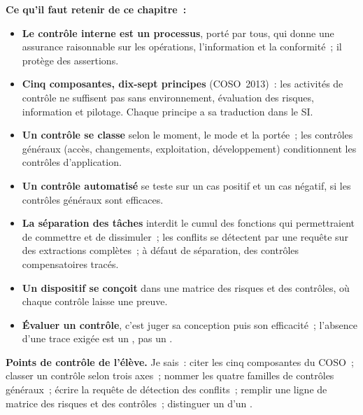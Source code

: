 \begin{boxresume}
\textbf{Ce qu'il faut retenir de ce chapitre~:}
\begin{itemize}
    \item \textbf{Le contrôle interne est un processus}, porté par tous,
          qui donne une assurance raisonnable sur les opérations,
          l'information et la conformité~; il protège des assertions.
    \item \textbf{Cinq composantes, dix-sept principes} (COSO~2013)~: les
          activités de contrôle ne suffisent pas sans environnement,
          évaluation des risques, information et pilotage. Chaque principe
          a sa traduction dans le SI.
    \item \textbf{Un contrôle se classe} selon le moment, le mode et la
          portée~; les contrôles généraux (accès, changements,
          exploitation, développement) conditionnent les contrôles
          d'application.
    \item \textbf{Un contrôle automatisé} se teste sur un cas positif et un
          cas négatif, si les contrôles généraux sont efficaces.
    \item \textbf{La séparation des tâches} interdit le cumul des fonctions
          qui permettraient de commettre et de dissimuler~; les conflits se
          détectent par une requête sur des extractions complètes~; à
          défaut de séparation, des contrôles compensatoires tracés.
    \item \textbf{Un dispositif se conçoit} dans une matrice des risques et
          des contrôles, où chaque contrôle laisse une preuve.
    \item \textbf{Évaluer un contrôle}, c'est juger sa conception puis son
          efficacité~; l'absence d'une trace exigée est un \NON{}, pas un
          \NEK{}.
\end{itemize}
\end{boxresume}

\begin{boxinfo}
\textbf{Points de contrôle de l'élève.} Je sais~: citer les cinq
composantes du COSO~; classer un contrôle selon trois axes~; nommer les
quatre familles de contrôles généraux~; écrire la requête de détection des
conflits~; remplir une ligne de matrice des risques et des contrôles~;
distinguer un \NON{} d'un \NEK{}.
\end{boxinfo}

\bigskip

